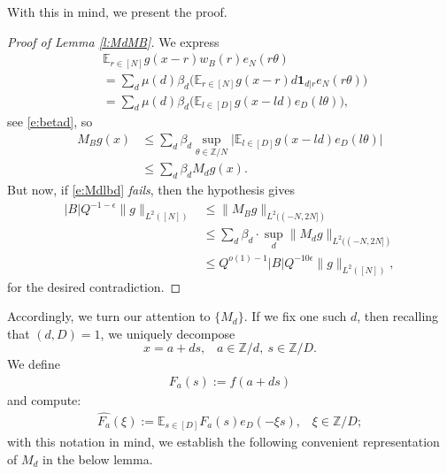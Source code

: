 \documentclass[12pt]{amsart}
\numberwithin{equation}{section}
\theoremstyle{definition}
\begin{document}
With this in mind, we present the proof.
\begin{proof}[Proof of Lemma \ref{l:MdMB}]
    We express
    \begin{align}
        &\mathbb{E}_{r \in [N]} g(x-r) w_B(r) e_N(r\theta) \\
        &= \sum_d \mu(d) \beta_d \big( \mathbb{E}_{r \in [N]} g(x-r) d \mathbf{1}_{d|r} e_N(r \theta) \big) \\
        & = \sum_d \mu(d) \beta_d \big( \mathbb{E}_{l \in [D]} g(x-ld) e_D(l \theta) \big),
    \end{align}
see \eqref{e:betad}, so
\begin{align}
    M_B g(x) &\leq \sum_d \beta_d \sup_{\theta \in \mathbb{Z}/N} \big| \mathbb{E}_{l \in [D]} g(x-ld) e_D(l \theta) \big| \\
    & \leq \sum_d \beta_d M_d g(x).
\end{align}
But now, if \eqref{e:Mdlbd} \emph{fails}, then the hypothesis gives
\begin{align}
    |B| Q^{-1-\epsilon}\|g\|_{L^2([N])} &\leq \| M_B g \|_{L^2( (-N,2N] )} \\
    &\leq \sum_d \beta_d \cdot \sup_d \|M_d g \|_{L^2( (-N,2N] )} \\
    & \leq Q^{o(1) -1} |B| Q^{-10 \epsilon} \| g \|_{L^2([N])},
\end{align}
for the desired contradiction.
\end{proof}

Accordingly, we turn our attention to $\{ M_d \}$. If we fix one such $d$, then recalling that $(d,D) = 1$, we uniquely decompose
\[ x = a + ds, \; \; \; a \in \mathbb{Z}/d, \ s \in \mathbb{Z}/D.\]
We define
\begin{align}\label{e:fF} F_a(s) := f(a + ds)
\end{align}
and compute:
\begin{align}
    \widehat{F_a}(\xi) := \mathbb{E}_{s\in[D]} F_a(s) e_D(-\xi s), \; \; \; \xi \in \mathbb{Z}/D;
\end{align}
with this notation in mind, we establish the following convenient representation of $M_d$ in the below lemma.
\end{document}

